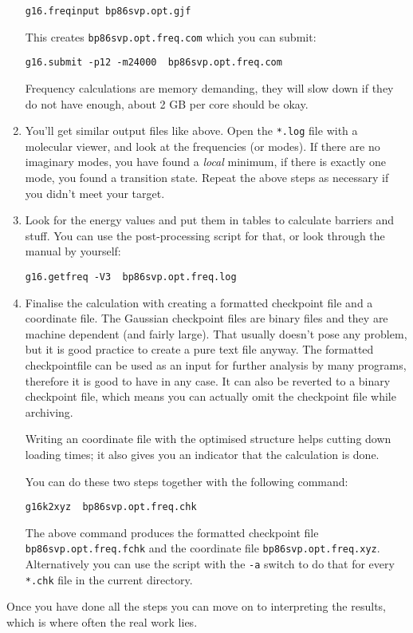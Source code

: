 \documentclass[   %
  final,          %
  a4paper         %
]{article}
\begin{document}
\begin{enumerate}
  \lstinline`g16.freqinput bp86svp.opt.gjf`

  This creates \texttt{bp86svp.opt.freq.com} which you can submit:

  \lstinline`g16.submit -p12 -m24000  bp86svp.opt.freq.com`

  Frequency calculations are memory demanding, they will slow down if
  they do not have enough, about 2 GB per core should be okay.
\item
  You'll get similar output files like above. Open the \texttt{*.log}
  file with a molecular viewer, and look at the frequencies (or modes).
  If there are no imaginary modes, you have found a \emph{local}
  minimum, if there is exactly one mode, you found a transition state.
  Repeat the above steps as necessary if you didn't meet your target.
\item
  Look for the energy values and put them in tables to calculate
  barriers and stuff. You can use the post-processing script for that,
  or look through the manual by yourself:

  \lstinline`g16.getfreq -V3  bp86svp.opt.freq.log`
\item
  Finalise the calculation with creating a formatted checkpoint file and
  a coordinate file. The Gaussian checkpoint files are binary files and
  they are machine dependent (and fairly large). 
  That usually doesn't pose any problem, but
  it is good practice to create a pure text file anyway. The formatted
  checkpointfile can be used as an input for further analysis by many
  programs, therefore it is good to have in any case. 
  It can also be reverted to a binary checkpoint file, which means you
  can actually omit the checkpoint file while archiving.
  
  Writing an coordinate file with the optimised structure helps cutting 
  down loading times; it also gives you an indicator that the calculation 
  is done.

  You can do these two steps together with the following command:

  \lstinline`g16k2xyz  bp86svp.opt.freq.chk`

  The above command produces the formatted checkpoint file
  \texttt{bp86svp.opt.freq.fchk} and the coordinate file
  \texttt{bp86svp.opt.freq.xyz}. Alternatively you can use the script
  with the \lstinline`-a` switch to do that for every \texttt{*.chk} file
  in the current directory.
\end{enumerate}

Once you have done all the steps you can move on to interpreting the
results, which is where often the real work lies.
\end{document}
